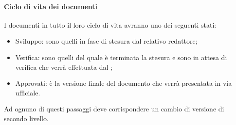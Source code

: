 \documentclass[../NormeDiProgetto_v4.0.0.tex]{subfiles}
\begin{document}
			\paragraph{Ciclo di vita dei documenti}
				I documenti in tutto il loro ciclo di vita avranno uno dei seguenti stati:
				\begin{itemize}
				\item Sviluppo: sono quelli in fase di stesura dal relativo redattore;
				\item Verifica: sono quelli del quale è terminata la stesura e sono in attesa di verifica che verrà effettuata dal \responsabilediprogetto;
				\item Approvati: è la versione finale del documento che verrà presentata in via ufficiale.
				\end{itemize}
				Ad ognuno di questi passaggi deve corrispondere un cambio di versione di secondo livello.
\end{document}
